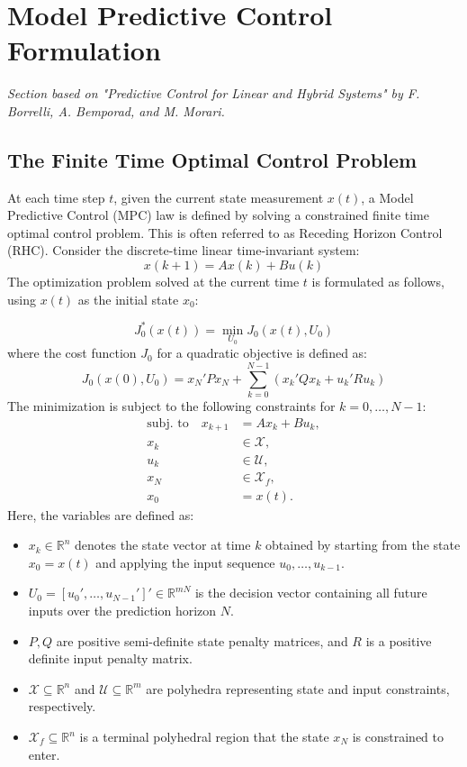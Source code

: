 \section{Model Predictive Control Formulation}
\textit{Section based on "Predictive Control for Linear and Hybrid Systems" by F. Borrelli, A. Bemporad, and M. Morari.}

\subsection{The Finite Time Optimal Control Problem}

At each time step $t$, given the current state measurement $x(t)$, a Model Predictive Control (MPC) law is defined by solving a constrained finite time optimal control problem. This is often referred to as Receding Horizon Control (RHC).
\noindent
Consider the discrete-time linear time-invariant system:
\begin{equation}
    x(k+1) = Ax(k) + Bu(k)
\end{equation}
The optimization problem solved at the current time $t$ is formulated as follows, using $x(t)$ as the initial state $x_0$:

\begin{equation}
    J_0^*(x(t)) = \min_{U_0} J_0(x(t), U_0)
\end{equation}
where the cost function $J_0$ for a quadratic objective is defined as:
\begin{equation}
    J_0(x(0), U_0) = x_N' P x_N + \sum_{k=0}^{N-1} (x_k'Qx_k + u_k'Ru_k)
\end{equation}
The minimization is subject to the following constraints for $k=0, \dots, N-1$:
\begin{align}
    \text{subj. to} \quad x_{k+1} &= Ax_k + Bu_k, \\
    x_k &\in \mathcal{X}, \\
    u_k &\in \mathcal{U}, \\
    x_N &\in \mathcal{X}_f, \\
    x_0 &= x(t).
\end{align}
Here, the variables are defined as:
\begin{itemize}
    \item $x_k \in \mathbb{R}^n$ denotes the state vector at time $k$ obtained by starting from the state $x_0 = x(t)$ and applying the input sequence $u_0, \dots, u_{k-1}$.
    \item $U_0 = [u_0', \dots, u_{N-1}']' \in \mathbb{R}^{mN}$ is the decision vector containing all future inputs over the prediction horizon $N$.
    \item $P, Q$ are positive semi-definite state penalty matrices, and $R$ is a positive definite input penalty matrix.
    \item $\mathcal{X} \subseteq \mathbb{R}^n$ and $\mathcal{U} \subseteq \mathbb{R}^m$ are polyhedra representing state and input constraints, respectively.
    \item $\mathcal{X}_f \subseteq \mathbb{R}^n$ is a terminal polyhedral region that the state $x_N$ is constrained to enter.
\end{itemize}

